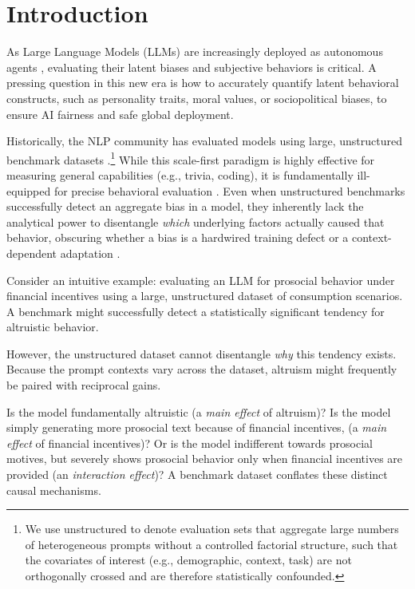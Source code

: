 \section{Introduction}


As Large Language Models (LLMs) are increasingly deployed as autonomous agents \citep{wang2024survey, xi2025rise}
, evaluating their latent biases and subjective behaviors is critical. A pressing question in this new era is how to accurately quantify latent behavioral constructs, such as personality traits, moral values, or sociopolitical biases, to ensure AI fairness and safe global deployment.

Historically, the NLP community has evaluated models using large, unstructured benchmark datasets \citep{hendrycks2020measuring, bommasani2023holistic}.\footnote{We use unstructured to denote evaluation sets that aggregate large numbers of heterogeneous prompts without a controlled factorial structure, such that the covariates of interest (e.g., demographic, context, task) are not orthogonally crossed and are therefore statistically confounded.}
While this scale-first paradigm is highly effective for measuring general capabilities (e.g., trivia, coding), it is fundamentally ill-equipped for precise behavioral evaluation \citep{pmlr-v202-santurkar23a, durmus2024towards}. 
Even when unstructured benchmarks successfully detect an aggregate bias in a model, they inherently lack the analytical power to disentangle \emph{which} underlying factors actually caused that behavior, obscuring whether a bias is a hardwired training defect or a context-dependent adaptation \citep{wadi2026shopping}.

Consider an intuitive example: evaluating an LLM for prosocial behavior under financial incentives using a large, unstructured dataset of consumption scenarios. 
A benchmark might successfully detect a statistically significant tendency for altruistic behavior.
 
 However, the unstructured dataset cannot disentangle \emph{why} this tendency exists. 
Because the prompt contexts vary across the dataset, altruism might frequently be paired with reciprocal gains.

Is the model fundamentally altruistic (a \emph{main effect} of altruism)? Is the model simply generating more prosocial text because of financial incentives, (a \emph{main effect} of financial incentives)? 
Or is the model indifferent towards prosocial motives, but severely shows prosocial behavior only when financial incentives are provided (an \emph{interaction effect})? 
A benchmark dataset conflates these distinct causal mechanisms.

